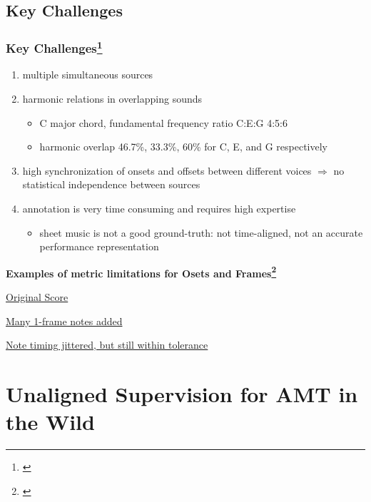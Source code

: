 \documentclass{beamer}
\newcommand{\emp}[1]{\textcolor{tum}{\textbf{#1}}}
\begin{document}
\subsection{Key Challenges}
\begin{frame}
	\frametitle{Key Challenges\footnote{\cite{Overview}}}
	\begin{enumerate}
		\item multiple simultaneous sources
		\item harmonic relations in overlapping sounds
		      \begin{itemize}
			      \item C major chord, fundamental frequency ratio C:E:G 4:5:6
			      \item harmonic overlap 46.7\%, 33.3\%, 60\% for C, E, and G respectively
		      \end{itemize}
		\item high synchronization of onsets and offsets between different voices $\Rightarrow$ no statistical independence between sources
		\item annotation is very time consuming and requires high expertise
		      \begin{itemize}
			      \item sheet music is not a good ground-truth: not time-aligned, not an accurate performance representation
		      \end{itemize}
	\end{enumerate}

	\emp{Examples of metric limitations for Osets and Frames\footnote{\cite{OF}}}

	\href{https://storage.googleapis.com/magentadata/papers/onsets-frames/fur_elise_framescore_good2.mp3}{Original Score}

	\href{https://storage.googleapis.com/magentadata/papers/onsets-frames/fur_elise_framescore_bad3.mp3}{Many 1-frame notes added}

	\href{https://storage.googleapis.com/magentadata/papers/onsets-frames/fur_elise_notejitter_score1.mp3}{Note timing jittered, but still within tolerance}



\end{frame}


\section{Unaligned Supervision for AMT in the Wild}
\end{document}
